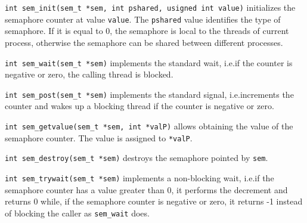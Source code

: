 \begin{description}
\item \texttt{int sem\_init(sem\_t *sem, int pshared, usigned int value)} initializes the semaphore counter at value \texttt{value}. The \texttt{pshared} value identifies the type of semaphore. If it is equal to 0, the semaphore is local to the threads of current process, otherwise the semaphore can be shared between different processes.

\item \texttt{int sem\_wait(sem\_t *sem)} implements the standard wait, i.e.\@ if the counter is negative or zero, the calling thread is blocked.

\item \texttt{int sem\_post(sem\_t *sem)} implements the standard signal, i.e.\@ increments the counter and wakes up a blocking thread if the counter is negative or zero.

\item \texttt{int sem\_getvalue(sem\_t *sem, int *valP)} allows obtaining the value of the semaphore counter. The value is assigned to \texttt{*valP}.

\item \texttt{int sem\_destroy(sem\_t *sem)} destroys the semaphore pointed by \texttt{sem}.

\item \texttt{int sem\_trywait(sem\_t *sem)} implements a non-blocking wait, i.e.\@ if the semaphore counter has a value greater than 0, it performs the decrement and returns 0 while, if the semaphore counter is negative or zero, it returns -1 instead of blocking the caller as \texttt{sem\_wait} does.
\end{description}

